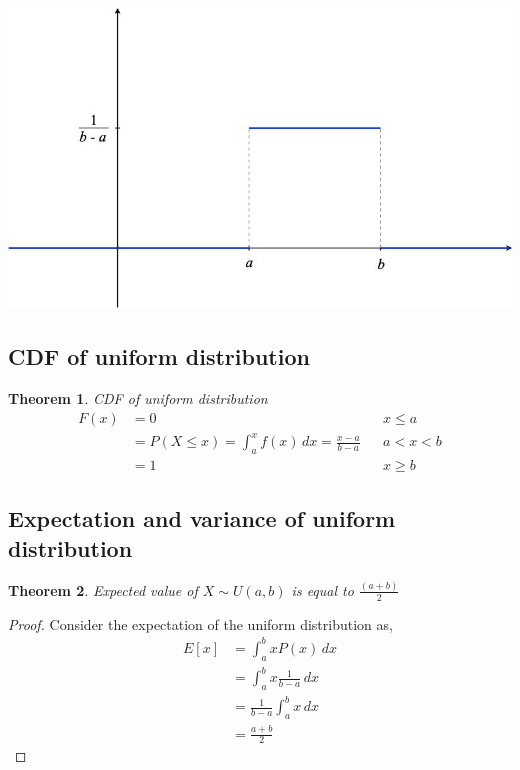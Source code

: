 \documentclass[oneside,11pt,pdftex]{book}%
\numberwithin{equation}{section}
\newtheorem{theorem}{Theorem}[chapter]%
\numberwithin{section}{chapter}
\numberwithin{equation}{chapter}
\begin{document}
\includegraphics[scale=0.3]{uniform}

\subsection{CDF of uniform distribution}
\begin{theorem}\label{ref:cdfuniform}
	CDF of uniform distribution
	\begin{align*}
		F(x)&=0 && x \leq a\\
		&= P(X\leq x)= \int_a^x f(x)\,dx=\frac{x-a}{b-a} && a<x<b\\
			&=1 && x\geq b
	\end{align*}
\end{theorem}


\subsection{Expectation and variance of uniform distribution}
\begin{theorem}
	Expected value of $ X \sim U(a,b) $ is equal to $\frac{(a+b)}{2}$
\end{theorem}


\begin{proof}
	Consider the expectation of the uniform distribution as,
	\begin{align*}
		E[x]&=\int_a^b x P(x)\, dx\\
		&= \int_a^b x \frac{1}{b-a}\, dx\\
		&= \frac{1}{b-a} \int_a^b x\, dx\\
		&= \frac{a+b}{2}
	\end{align*}
\end{proof}
\end{document}
